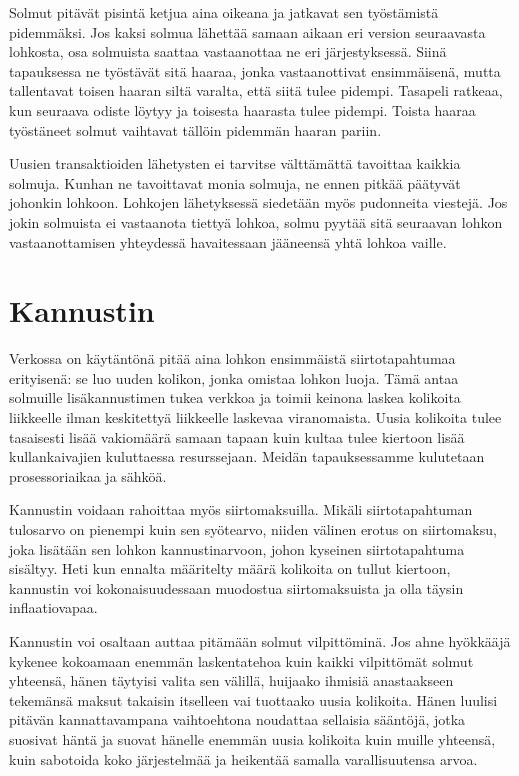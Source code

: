 \documentclass{article}
\begin{document}
Solmut pitävät pisintä ketjua aina oikeana ja jatkavat sen työstämistä pidemmäksi. Jos kaksi solmua lähettää samaan aikaan eri version seuraavasta lohkosta, osa solmuista saattaa vastaanottaa ne eri järjestyksessä. Siinä tapauksessa ne työstävät sitä haaraa, jonka vastaanottivat ensimmäisenä, mutta tallentavat toisen haaran siltä varalta, että siitä tulee pidempi. Tasapeli ratkeaa, kun seuraava odiste löytyy ja toisesta haarasta tulee pidempi. Toista haaraa työstäneet solmut vaihtavat tällöin pidemmän haaran pariin.

Uusien transaktioiden lähetysten ei tarvitse välttämättä tavoittaa kaikkia solmuja. Kunhan ne tavoittavat monia solmuja, ne ennen pitkää päätyvät johonkin lohkoon. Lohkojen lähetyksessä siedetään myös pudonneita viestejä. Jos jokin solmuista ei vastaanota tiettyä lohkoa, solmu pyytää sitä seuraavan lohkon vastaanottamisen yhteydessä havaitessaan jääneensä yhtä lohkoa vaille.


\section{Kannustin}

Verkossa on käytäntönä pitää aina lohkon ensimmäistä siirtotapahtumaa erityisenä: se luo uuden kolikon, jonka omistaa lohkon luoja. Tämä antaa solmuille lisäkannustimen tukea verkkoa ja toimii keinona laskea kolikoita liikkeelle ilman keskitettyä liikkeelle laskevaa viranomaista. Uusia kolikoita tulee tasaisesti lisää vakiomäärä samaan tapaan kuin kultaa tulee kiertoon lisää kullankaivajien kuluttaessa resurssejaan. Meidän tapauksessamme kulutetaan prosessoriaikaa ja sähköä.

Kannustin voidaan rahoittaa myös siirtomaksuilla. Mikäli siirtotapahtuman tulosarvo on pienempi kuin sen syötearvo, niiden välinen erotus on siirtomaksu, joka lisätään sen lohkon kannustinarvoon, johon kyseinen siirtotapahtuma sisältyy. Heti kun ennalta määritelty määrä kolikoita on tullut kiertoon, kannustin voi kokonaisuudessaan muodostua siirtomaksuista ja olla täysin inflaatiovapaa.

Kannustin voi osaltaan auttaa pitämään solmut vilpittöminä. Jos ahne hyök\-kää\-jä  kykenee kokoamaan enemmän laskentatehoa kuin kaikki vilpittömät solmut yhteensä, hänen täytyisi valita sen välillä, huijaako ihmisiä anastaakseen tekemänsä maksut takaisin itselleen vai tuottaako uusia kolikoita. Hänen luulisi pitävän kannattavampana vaihtoehtona noudattaa sellaisia sääntöjä, jotka suosivat häntä ja suovat hänelle enemmän uusia kolikoita kuin muille yhteensä, kuin sabotoida koko järjestelmää ja heikentää samalla varallisuutensa arvoa.
\end{document}
